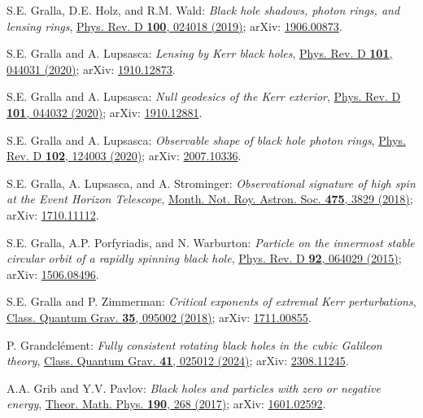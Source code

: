\begin{thebibliography}{123}
S.E. Gralla, D.E. Holz, and R.M. Wald:
{\em Black hole shadows, photon rings, and lensing rings},
\href{https://doi.org/10.1103/PhysRevD.100.024018}{Phys. Rev. D {\bf 100}, 024018 (2019)};
arXiv: \href{https://arxiv.org/abs/1906.00873}{1906.00873}.

S.E. Gralla and A. Lupsasca:
{\em Lensing by Kerr black holes},
\href{https://doi.org/10.1103/PhysRevD.101.044031}{Phys. Rev. D {\bf 101}, 044031 (2020)};
arXiv: \href{https://arxiv.org/abs/1910.12873}{1910.12873}.

S.E. Gralla and A. Lupsasca:
{\em Null geodesics of the Kerr exterior},
\href{https://doi.org/10.1103/PhysRevD.101.044032}{Phys. Rev. D {\bf 101}, 044032 (2020)};
arXiv: \href{https://arxiv.org/abs/1910.12881}{1910.12881}.

S.E. Gralla and A. Lupsasca:
{\em Observable shape of black hole photon rings},
\href{https://doi.org/10.1103/PhysRevD.102.124003}{Phys. Rev. D {\bf 102}, 124003 (2020)};
arXiv: \href{https://arxiv.org/abs/2007.10336}{2007.10336}.

S.E. Gralla, A. Lupsasca, and A. Strominger:
{\em Observational signature of high spin at the Event Horizon Telescope},
\href{https://doi.org/10.1093/mnras/sty039}{Month. Not. Roy. Astron. Soc. {\bf 475}, 3829 (2018)};
arXiv: \href{https://arxiv.org/abs/1710.11112}{1710.11112}.

S.E. Gralla, A.P. Porfyriadis, and N. Warburton:
{\em Particle on the innermost stable circular orbit of a rapidly spinning black hole},
\href{https://doi.org/10.1103/PhysRevD.92.064029}{Phys. Rev. D {\bf 92}, 064029 (2015)};
arXiv: \href{https://arxiv.org/abs/1506.08496}{1506.08496}.

S.E. Gralla and P. Zimmerman:
{\em Critical exponents of extremal Kerr perturbations},
\href{https://doi.org/10.1088/1361-6382/aab140}{Class. Quantum Grav. {\bf 35}, 095002 (2018)};
arXiv: \href{https://arxiv.org/abs/1711.00855}{1711.00855}.

P. Grandclément:
{\em Fully consistent rotating black holes in the cubic Galileon theory},
\href{https://doi.org/10.1088/1361-6382/ad17f1}{Class. Quantum Grav. {\bf 41}, 025012 (2024)};
arXiv: \href{https://arxiv.org/abs/2308.11245}{2308.11245}.

A.A. Grib and Y.V. Pavlov:
{\em Black holes and particles with zero or negative energy},
\href{https://doi.org/10.1134/S0040577917020088}{Theor. Math. Phys. {\bf 190}, 268 (2017)};
arXiv: \href{https://arxiv.org/abs/1601.02592}{1601.02592}.


\end{thebibliography}
